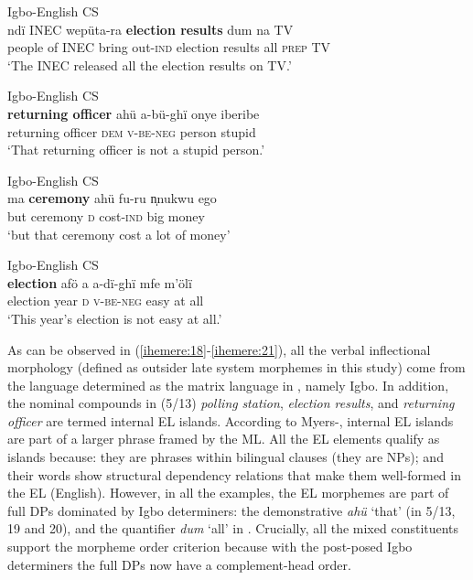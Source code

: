 \documentclass[output=paper]{langsci/langscibook}
\begin{document}
\ea
{Igbo-English CS}\\
\gll ndï    INEC  wepüta-ra  \textbf{election results}   dum  na  TV\\
     people of  INEC  bring out-\textsc{ind}   election results  all  \textsc{prep}  TV\\
\glt ‘The INEC released all the election results on TV.’    
\z

\ea
{Igbo-English CS}\\
\gll \textbf{returning officer}  ahü       a-bü-ghï        onye    iberibe\\
     returning officer     \textsc{dem}  \textsc{v-be-neg}  person  stupid\\
\glt ‘That returning officer is not a stupid person.’
\z

\ea
{Igbo-English CS}\\
\gll ma  \textbf{ceremony}   ahü  fu-ru      n̩nukwu   ego\\
     but ceremony  \textsc{d}  cost-\textsc{ind}  big    money\\
\glt ‘but that ceremony cost a lot of money’
\z

\ea
{Igbo-English CS}\\
\gll \textbf{election}  afö  a  a-dï-ghï  mfe  m’ölï\\
     election    year  \textsc{d}  \textsc{v-be-neg}  easy  at all\\
\glt ‘This year’s election is not easy at all.’
\z

As can be observed in (\ref{ihemere:18}-\ref{ihemere:21}), all the verbal inflectional morphology (defined as outsider late system morphemes in this study) come from the language determined as the matrix language in , namely Igbo. In addition, the nominal compounds in (5/13) \textit{polling}\textbf{\textit{}} \textit{station},  \textit{election results}, and  \textit{returning officer} are termed internal EL islands. According to Myers-\citet[265]{Scotton2006}, internal EL islands are part of a larger phrase framed by the ML. All the EL elements qualify as islands because: they are phrases within bilingual clauses (they are NPs); and their words show structural dependency relations that make them well-formed in the EL (English). However, in all the examples, the EL morphemes are part of full DPs dominated by Igbo determiners: the demonstrative \textit{ahü} ‘that’ (in 5/13, 19 and 20), and the quantifier \textit{dum} ‘all’ in . Crucially, all the mixed constituents support the morpheme order criterion because with the post-posed Igbo determiners the full DPs now have a complement-head order. 
\end{document}
